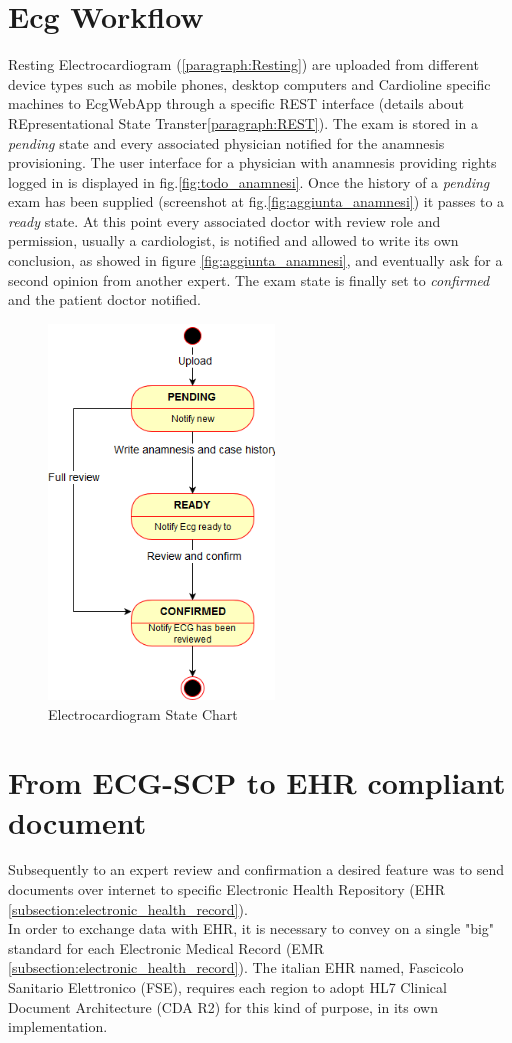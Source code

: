 \section{Ecg Workflow}
\label{section:ecgworkflow}
Resting Electrocardiogram (\ref{paragraph:Resting}) are uploaded from different device types such as mobile phones, desktop computers and Cardioline specific machines to EcgWebApp through a specific REST interface (details about REpresentational State Transter\ref{paragraph:REST}). The exam is stored in a \textit{pending} state and every associated physician notified for the anamnesis provisioning.
The user interface for a physician with anamnesis providing rights logged in is displayed in fig.\ref{fig:todo_anamnesi}.
Once the history of a \textit{pending} exam has been supplied (screenshot at fig.\ref{fig:aggiunta_anamnesi}) it passes to a \textit{ready} state. At this point every associated doctor with review role and permission, usually a cardiologist, is notified and allowed to write its own conclusion, as showed in figure \ref{fig:aggiunta_anamnesi}, and eventually ask for a second opinion from another expert. The exam state is finally set to \textit{confirmed} and the patient doctor notified.
\begin{figure}[h]
    \centering
    \includegraphics[width=6cm]{img/ECGstatechart}
    \caption{Electrocardiogram State Chart}
    \label{fig:ECGstatechart}
\end{figure}
\clearpage

\section{From ECG-SCP to EHR compliant document}
\label{section:from_ECG_SCP_to_EHR_compliant_document}
Subsequently to an expert review and confirmation a desired feature was to send documents over internet to specific Electronic Health Repository (EHR \ref{subsection:electronic_health_record}).\\
In order to exchange data with EHR, it is necessary to convey on a single "big" standard for each Electronic Medical Record (EMR \ref{subsection:electronic_health_record}). The italian EHR named, Fascicolo Sanitario Elettronico (FSE), requires each region to adopt HL7 Clinical Document Architecture (CDA R2) for this kind of purpose, in its own implementation.

